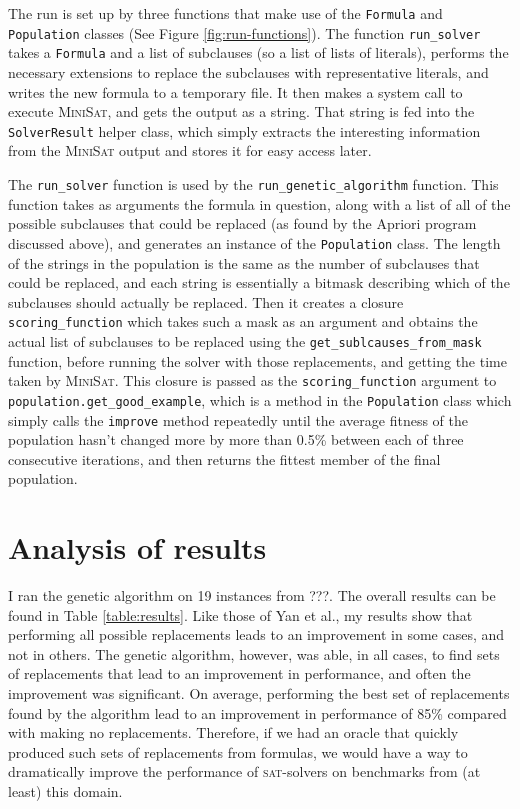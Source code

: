 \documentclass[proof,pdftex,11pt,a4,titlepage]{article}
\def\code{\lstinline[basicstyle=\textsize\ttfamily]}
\newcommand{\sat}{\textsc{sat}}
\begin{document}
The run is set up by three functions that make use of the \code{Formula} and \code{Population} classes (See Figure \ref{fig:run-functions}). The function \code{run_solver} takes a \code{Formula} and a list of subclauses (so a list of lists of literals), performs the necessary extensions to replace the subclauses with representative literals, and writes the new formula to a temporary file. It then makes a system call to execute \textsc{MiniSat}, and gets the output as a string. That string is fed into the \code{SolverResult} helper class, which simply extracts the interesting information from the \textsc{MiniSat} output and stores it for easy access later.

The \code{run_solver} function is used by the \code{run_genetic_algorithm} function. This function takes as arguments the formula in question, along with a list of all of the possible subclauses that could be replaced (as found by the Apriori program discussed above), and generates an instance of the \code{Population} class. The length of the strings in the population is the same as the number of subclauses that could be replaced, and each string is essentially a bitmask describing which of the subclauses should actually be replaced. Then it creates a closure \code{scoring_function} which takes such a mask as an argument and obtains the actual list of subclauses to be replaced using the \code{get_sublcauses_from_mask} function, before running the solver with those replacements, and getting the time taken by \textsc{MiniSat}. This closure is passed as the \code{scoring_function} argument to \code{population.get_good_example}, which is a method in the \code{Population} class which simply calls the \code{improve} method repeatedly until the average fitness of the population hasn't changed more by more than 0.5\% between each of three consecutive iterations, and then returns the fittest member of the final population.

\section{Analysis of results}

I ran the genetic algorithm on 19 instances from ???. The overall results can be found in Table \ref{table:results}. Like those of Yan et al., my results show that performing all possible replacements leads to an improvement in some cases, and not in others. The genetic algorithm, however, was able, in all cases, to find sets of replacements that lead to an improvement in performance, and often the improvement was significant. On average, performing the best set of replacements found by the algorithm lead to an improvement in performance of 85\% compared with making no replacements. Therefore, if we had an oracle that quickly produced such sets of replacements from formulas, we would have a way to dramatically improve the performance of \sat{}-solvers on benchmarks from (at least) this domain.
\end{document}
